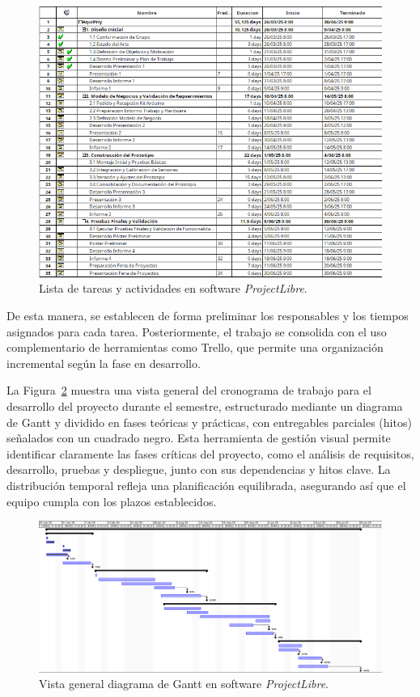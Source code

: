 \documentclass{article}
\begin{document}
\begin{figure}[H]
    \centering
    \includegraphics[width=.95\linewidth]{images/cartaGantt1of2.png}
    \caption{Lista de tareas y actividades en software \textit{ProjectLibre}.}
    \label{fig:cartaGantt1of2}
\end{figure}

De esta manera, se establecen de forma preliminar los responsables y los tiempos asignados para cada tarea. Posteriormente, el trabajo se consolida con el uso complementario de herramientas como Trello, que permite una organización incremental según la fase en desarrollo.

La Figura~\ref{fig:cartaGantt2of2} muestra una vista general del cronograma de trabajo para el desarrollo del proyecto durante el semestre, estructurado mediante un diagrama de Gantt y dividido en fases teóricas y prácticas, con entregables parciales (hitos) señalados con un cuadrado negro. Esta herramienta de gestión visual permite identificar claramente las fases críticas del proyecto, como el análisis de requisitos, desarrollo, pruebas y despliegue, junto con sus dependencias y hitos clave. La distribución temporal refleja una planificación equilibrada, asegurando así que el equipo cumpla con los plazos establecidos. 

\begin{figure}[H]
    \centering
    \includegraphics[width=.95\linewidth]{images/cartaGantt2of2.png}
    \caption{Vista general diagrama de Gantt en software \textit{ProjectLibre}.}
    \label{fig:cartaGantt2of2}
\end{figure}
\end{document}
